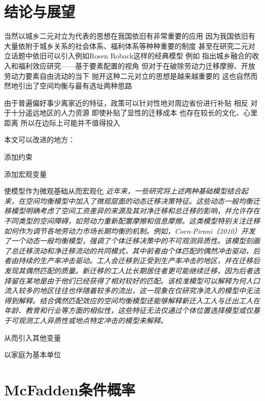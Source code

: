 \documentclass[a4paper,12pt,oneside]{book} %
\begin{document}
\chapter{结论与展望}

当然以城乡二元对立为代表的思想在我国依旧有非常重要的应用 因为我国依旧有大量依附于城乡关系的社会体系、福利体系等种种重要的制度
甚至在研究二元对立话题中依旧可以引入例如Rosen Roback这样的经典模型
例如 
\cite{GuoDongMeiChengXiangRongHeDeShouRuHeFuLiXiaoYingYanJiuJiYuYaoSuPeiZhiDeShiJiao2023}指出城乡融合的收入和福利效应研究——基于要素配置的视角
但对于在破除劳动力迁移摩擦、开放劳动力要素自由流动的当下
抛开这种二元对立的思想是越来越重要的
这也自然而然地引出了空间均衡与最有选址两种思路



由于普遍偏好事少离家近的特征，政策可以针对性地对周边省份进行补贴
相反 对于十分遥远地区的人力资源 即使补贴了显性的迁移成本 也存在较长的文化、心里距离 所以在边际上可能并不值得投入



本文可以改进的地方：

添加约束

添加宏观变量

使模型作为微观基础从而宏观化
\textit{近年来，一些研究将上述两种基础模型结合起来，在空间均衡模型中加入了微观层面的动态迁移决策特征。这些动态一般均衡迁移模型明确考虑了空间工资差异的来源及其对净迁移和总迁移的影响，并允许存在不同类型的空间障碍，如劳动力重新配置摩擦和信息摩擦。这类模型特别关注迁移如何作为调节各地劳动力市场长期均衡的机制。例如，Coen-Pirani（2010）开发了一个动态一般均衡模型，强调了个体迁移决策中的不可观测异质性。该模型刻画了总迁移流动和净迁移流动的共同模式，其中前者由个体匹配的偶然冲击驱动，后者由持续的生产率冲击驱动。工人会迁移到正受到生产率冲击的地区，并在迁移后发现其偶然匹配的质量。新迁移的工人比长期居住者更可能继续迁移，因为后者选择留在某地是由于他们已经获得了相对较好的匹配。该校准模型可以解释为何人口流入较多的地区往往也伴随着较多的流出，这一现象在仅研究净流入的模型中无法得到解释。结合偶然匹配效应的空间均衡模型还能够解释新迁入工人与迁出工人在年龄、教育和行业等方面的相似性，这些特征无法仅通过个体位置选择模型或仅基于可观测工人异质性或地点特定冲击的模型来解释。}

从而引入其他变量

以家庭为基本单位


\newpage
\appendix

\chapter{McFadden条件概率}
\end{document}
